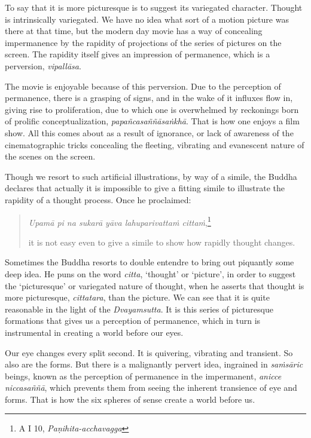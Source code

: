 To say that it is more picturesque is to suggest its variegated character. Thought is intrinsically variegated. We have no idea what sort of a motion picture was there at that time, but the modern day movie has a way of concealing impermanence by the rapidity of projections of the series of pictures on the screen. The rapidity itself gives an impression of permanence, which is a perversion, \emph{vipallāsa}.

The movie is enjoyable because of this perversion. Due to the perception of permanence, there is a grasping of signs, and in the wake of it influxes flow in, giving rise to proliferation, due to which one is overwhelmed by reckonings born of prolific conceptualization, \emph{papañcasaññāsaṅkhā}. That is how one enjoys a film show. All this comes about as a result of ignorance, or lack of awareness of the cinematographic tricks concealing the fleeting, vibrating and evanescent nature of the scenes on the screen.

Though we resort to such artificial illustrations, by way of a simile, the Buddha declares that actually it is impossible to give a fitting simile to illustrate the rapidity of a thought process. Once he proclaimed:

\begin{quote}
\emph{Upamā pi na sukarā yāva lahuparivattaṁ cittaṁ},\footnote{A I 10, \emph{Paṇihita-acchavagga}}

it is not easy even to give a simile to show how rapidly thought changes.
\end{quote}

Sometimes the Buddha resorts to double entendre to bring out piquantly some deep idea. He puns on the word \emph{citta}, `thought' or `picture', in order to suggest the `picturesque' or variegated nature of thought, when he asserts that thought is more picturesque, \emph{cittatara}, than the picture. We can see that it is quite reasonable in the light of the \emph{Dvayamsutta}. It is this series of picturesque formations that gives us a perception of permanence, which in turn is instrumental in creating a world before our eyes.

Our eye changes every split second. It is quivering, vibrating and transient. So also are the forms. But there is a malignantly pervert idea, ingrained in \emph{saṁsāric} beings, known as the perception of permanence in the impermanent, \emph{anicce niccasaññā}, which prevents them from seeing the inherent transience of eye and forms. That is how the six spheres of sense create a world before us.

